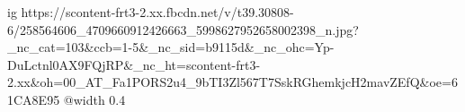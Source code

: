 
 
 
 
 

\ifcmt
  ig https://scontent-frt3-2.xx.fbcdn.net/v/t39.30808-6/258564606_4709660912426663_5998627952658002398_n.jpg?_nc_cat=103&ccb=1-5&_nc_sid=b9115d&_nc_ohc=Yp-DuLctnl0AX9FQjRP&_nc_ht=scontent-frt3-2.xx&oh=00_AT_Fa1PORS2u4_9bTI3Zl567T7SskRGhemkjcH2mavZEfQ&oe=61CA8E95
  @width 0.4
\fi
